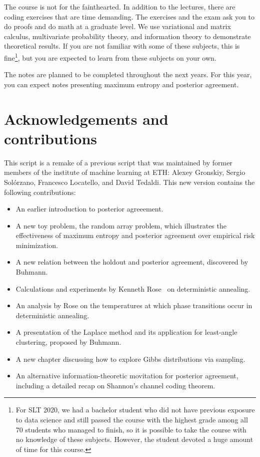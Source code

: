 The course is not for the fainthearted. In addition to the lectures, there are coding exercises that are time demanding. The exercises and the exam ask you to do proofs and do math at a graduate level. We use variational and matrix calculus, multivariate probability theory, and information theory to demonstrate theoretical results. If you are not familiar with some of these subjects, this is fine\footnote{For SLT 2020, we had a bachelor student who did not have previous exposure to data science and still passed the course with the highest grade among all 70 students who managed to finish, so it is possible to take the course with no knowledge of these subjects. However, the student devoted a huge amount of time for this course.}, but you are expected to learn from these subjects on your own.

The notes are planned to be completed throughout the next years. For
this year, you can expect notes presenting maximum entropy and posterior
agreement.

\section*{Acknowledgements and contributions}

This script is a remake of a previous script that was maintained by former
members of the institute of machine learning at ETH: Alexey Gronskiy,
Sergio Sol\'orzano, Francesco Locatello, and David Tedaldi. This new version
contains the following contributions:

\begin{itemize}
\item An earlier introduction to posterior agreeement.
\item A new toy problem, the random array problem, which illustrates
the effectiveness of maximum entropy and posterior agreement over
empirical risk minimization.
\item A new relation between the holdout and posterior agreement, discovered
by Buhmann.
\item Calculations and experiments by Kenneth Rose~\cite{rose1991deterministic, rose1998deterministic} on deterministic
annealing.
\item An analysis by Rose on the temperatures at which phase transitions
occur in deterministic annealing.
\item A presentation of the Laplace method and its application for least-angle
clustering, proposed by Buhmann.
\item A new chapter discussing how to explore Gibbs distributions via sampling.
\item An alternative information-theoretic movitation for posterior agreement,
including a detailed recap on Shannon's channel coding theorem.
\end{itemize}


